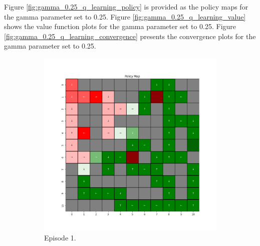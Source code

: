 \documentclass{assignment}
\begin{document}
Figure \ref{fig:gamma_0.25_q_learning_policy} is provided as the policy maps for the gamma parameter set to 0.25. Figure \ref{fig:gamma_0.25_q_learning_value} shows the value function plots for the gamma parameter set to 0.25. Figure \ref{fig:gamma_0.25_q_learning_convergence} presents the convergence plots for the gamma parameter set to 0.25.
\begin{figure}[H]
    \begin{subfigure}{0.3\textwidth}
        \includegraphics[width=\textwidth]{figures/policy_q/gamma_sweep/policy_alpha_0.1_gamma_0.25_epsilon_0.2_iteration_1.png}
    \caption{Episode 1.}
    \end{subfigure}\hfill
    \begin{subfigure}{0.3\textwidth}

\end{subfigure}
\end{figure}
\end{document}
